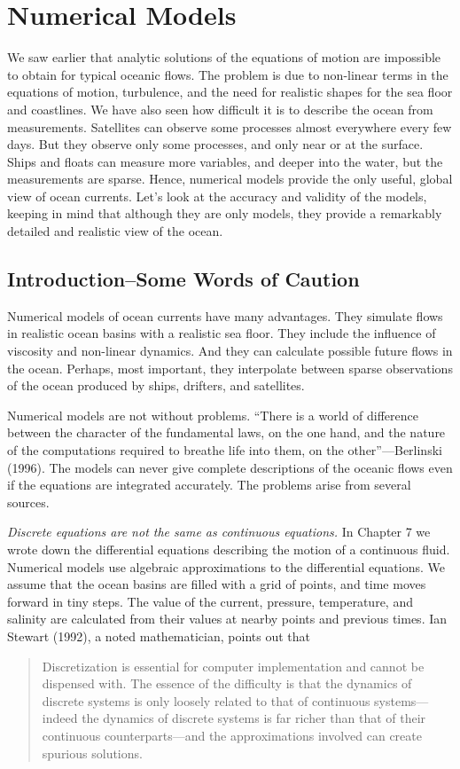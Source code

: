\chapter{Numerical Models}
\addtocounter{figure}{1}
We saw earlier that analytic solutions of the equations of motion are impossible to obtain for typical oceanic flows. The problem is due to non-linear terms in the equations of motion, turbulence, and the need for realistic shapes for the sea floor and coastlines. We have also seen how difficult it is to describe the ocean from measurements. Satellites can observe some processes almost everywhere every few days. But they observe only some processes, and only near or at the surface. Ships and floats can measure more variables, and deeper into the water, but the measurements are sparse. Hence, numerical models provide the only useful, global view of ocean currents. Let's look at the accuracy and validity of the models, keeping in mind that although they are only models, they provide a remarkably detailed and realistic view of the ocean.

\section{Introduction--Some Words of Caution}
Numerical models of ocean currents have many
advantages. They simulate flows in realistic ocean basins with a realistic sea
floor. They include the influence of viscosity and non-linear dynamics. And they can
calculate possible future flows in the ocean. Perhaps, most important, they
interpolate between sparse observations of the ocean produced by ships,
drifters, and satellites.

Numerical models are not without problems. ``There is a world of difference
between the character of the fundamental laws, on the one hand, and the nature
of the computations required to breathe life into them, on the
other''---Berlinski (1996). The models can never give complete descriptions of
the oceanic flows even if the equations are integrated accurately. The problems
arise from several sources.

\textit{Discrete equations are not the same as continuous equations.} In Chapter 7 we wrote down the differential equations describing the motion of a continuous fluid. Numerical models use algebraic approximations to the differential equations. We assume that the ocean basins are filled with a grid of points, and time moves forward in tiny steps. The value of the current, pressure, temperature, and salinity are calculated from their values at nearby points and previous times. Ian Stewart (1992), a noted mathematician, points out that
\begin{quote} \small
Discretization is essential for computer implementation and cannot be dispensed
with. The essence of the difficulty is that the dynamics of discrete systems is
only loosely related to that of continuous systems---indeed the dynamics of
discrete systems is far richer than that of their continuous counterparts---and
the approximations involved can create spurious solutions.
\end{quote}

